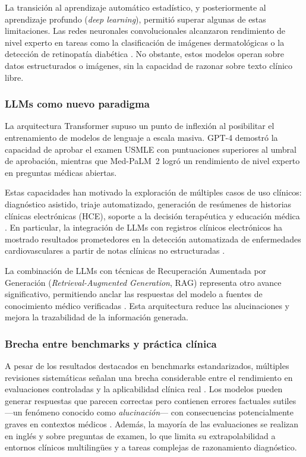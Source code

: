 La transición al aprendizaje automático estadístico, y posteriormente al aprendizaje profundo (\textit{deep learning}), permitió superar algunas de estas limitaciones. Las redes neuronales convolucionales alcanzaron rendimiento de nivel experto en tareas como la clasificación de imágenes dermatológicas \parencite{esteva2017} o la detección de retinopatía diabética \parencite{gulshan2016}. No obstante, estos modelos operan sobre datos estructurados o imágenes, sin la capacidad de razonar sobre texto clínico libre.

\subsubsection*{\ac{LLM}s como nuevo paradigma}

La arquitectura Transformer \parencite{vaswani2017attention} supuso un punto de inflexión al posibilitar el entrenamiento de modelos de lenguaje a escala masiva. \acs{GPT}-4 \parencite{openai2023} demostró la capacidad de aprobar el examen \ac{USMLE} con puntuaciones superiores al umbral de aprobación, mientras que Med-PaLM~2 \parencite{singhal2023medpalm} logró un rendimiento de nivel experto en preguntas médicas abiertas.

Estas capacidades han motivado la exploración de múltiples casos de uso clínicos: diagnóstico asistido, triaje automatizado, generación de resúmenes de historias clínicas electrónicas (\ac{HCE}), soporte a la decisión terapéutica y educación médica \parencite{he2025,wang2024llm}. En particular, la integración de \ac{LLM}s con registros clínicos electrónicos ha mostrado resultados prometedores en la detección automatizada de enfermedades cardiovasculares a partir de notas clínicas no estructuradas \parencite{pan2025}.

La combinación de \ac{LLM}s con técnicas de Recuperación Aumentada por Generación (\textit{Retrieval-Augmented Generation}, \acs{RAG}) representa otro avance significativo, permitiendo anclar las respuestas del modelo a fuentes de conocimiento médico verificadas \parencite{diteodoro2025,li2026}. Esta arquitectura reduce las alucinaciones y mejora la trazabilidad de la información generada.

\subsubsection*{Brecha entre benchmarks y práctica clínica}

A pesar de los resultados destacados en benchmarks estandarizados, múltiples revisiones sistemáticas señalan una brecha considerable entre el rendimiento en evaluaciones controladas y la aplicabilidad clínica real \parencite{park2024,wang2024chatgpt,jung2025}. Los modelos pueden generar respuestas que parecen correctas pero contienen errores factuales sutiles ---un fenómeno conocido como \textit{alucinación}--- con consecuencias potencialmente graves en contextos médicos \parencite{gorle2024,pennydimri2025}. Además, la mayoría de las evaluaciones se realizan en inglés y sobre preguntas de examen, lo que limita su extrapolabilidad a entornos clínicos multilingües y a tareas complejas de razonamiento diagnóstico.

